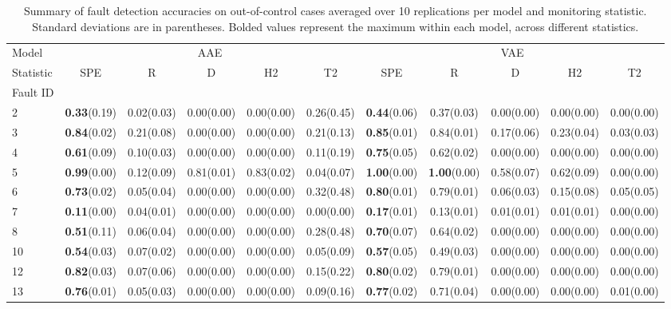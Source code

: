 \documentclass{scrartcl}
\theoremstyle{definition}
\begin{document}
\begin{table}[t]
\renewcommand{\arraystretch}{1.3}
\caption{Summary of fault detection accuracies on out-of-control cases averaged over 10 replications per model and monitoring statistic. Standard deviations are in parentheses. Bolded values represent the maximum within each model, across different statistics.}
\label{tab:rolling_results}

\begin{tabular}{lccccc|ccccc}
\toprule
Model & \multicolumn{5}{c}{AAE} & \multicolumn{5}{c}{VAE} \\
Statistic &         SPE &           R &           D &          H2 &          T2 &         SPE &           R &           D &          H2 &          T2 \\
Fault ID &             &             &             &             &             &             &             &             &             &             \\
\midrule
2                &  \textbf{0.33}(0.19) &  0.02(0.03) &  0.00(0.00) &  0.00(0.00) &  0.26(0.45) &  \textbf{0.44}(0.06) &  0.37(0.03) &  0.00(0.00) &  0.00(0.00) &  0.00(0.00) \\
3                &  \textbf{0.84}(0.02) &  0.21(0.08) &  0.00(0.00) &  0.00(0.00) &  0.21(0.13) &  \textbf{0.85}(0.01) &  0.84(0.01) &  0.17(0.06) &  0.23(0.04) &  0.03(0.03) \\
4                &  \textbf{0.61}(0.09) &  0.10(0.03) &  0.00(0.00) &  0.00(0.00) &  0.11(0.19) &  \textbf{0.75}(0.05) &  0.62(0.02) &  0.00(0.00) &  0.00(0.00) &  0.00(0.00) \\
5                &  \textbf{0.99}(0.00) &  0.12(0.09) &  0.81(0.01) &  0.83(0.02) &  0.04(0.07) &  \textbf{1.00}(0.00) &  \textbf{1.00}(0.00) &  0.58(0.07) &  0.62(0.09) &  0.00(0.00) \\
6                &  \textbf{0.73}(0.02) &  0.05(0.04) &  0.00(0.00) &  0.00(0.00) &  0.32(0.48) &  \textbf{0.80}(0.01) &  0.79(0.01) &  0.06(0.03) &  0.15(0.08) &  0.05(0.05) \\
7                &  \textbf{0.11}(0.00) &  0.04(0.01) &  0.00(0.00) &  0.00(0.00) &  0.00(0.00) &  \textbf{0.17}(0.01) &  0.13(0.01) &  0.01(0.01) &  0.01(0.01) &  0.00(0.00) \\
8                &  \textbf{0.51}(0.11) &  0.06(0.04) &  0.00(0.00) &  0.00(0.00) &  0.28(0.48) &  \textbf{0.70}(0.07) &  0.64(0.02) &  0.00(0.00) &  0.00(0.00) &  0.00(0.00) \\
10               &  \textbf{0.54}(0.03) &  0.07(0.02) &  0.00(0.00) &  0.00(0.00) &  0.05(0.09) &  \textbf{0.57}(0.05) &  0.49(0.03) &  0.00(0.00) &  0.00(0.00) &  0.00(0.00) \\
12               &  \textbf{0.82}(0.03) &  0.07(0.06) &  0.00(0.00) &  0.00(0.00) &  0.15(0.22) &  \textbf{0.80}(0.02) &  0.79(0.01) &  0.00(0.00) &  0.00(0.00) &  0.00(0.00) \\
13               &  \textbf{0.76}(0.01) &  0.05(0.03) &  0.00(0.00) &  0.00(0.00) &  0.09(0.16) &  \textbf{0.77}(0.02) &  0.71(0.04) &  0.00(0.00) &  0.00(0.00) &  0.01(0.00) \\
\bottomrule
\end{tabular}
\end{table}
\end{document}
